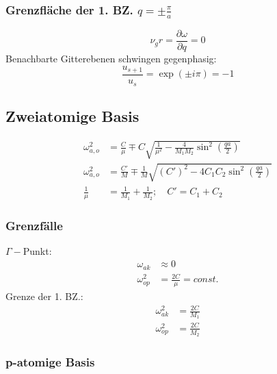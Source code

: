 \subsubsection*{Grenzfläche der 1. BZ. $q = \pm \frac{\pi}{a}$}
\begin{equation*}
    \nu_gr = \frac{\partial \omega}{\partial q} = 0
\end{equation*}
Benachbarte Gitterebenen schwingen gegenphasig:
\begin{equation*}
    \frac{u_{s+1}}{u_s} = \exp \left(\pm i \pi\right) = -1
\end{equation*}

\subsection*{Zweiatomige Basis}

\begin{equation*}
    \begin{aligned}
        \omega_{a,o}^2 &= \frac{C}{\mu} \mp C \sqrt{\frac{1}{\mu^2}- \frac{4}{M_1M_2} \sin^2\left(\frac{qa}{2}\right)} \\
        \omega_{a,o}^2 &= \frac{C'}{M} \mp \frac{1}{M} \sqrt{(C')^2- 4C_1 C_2 \sin^2\left(\frac{qa}{2}\right)} \\
        \frac{1}{\mu} &= \frac{1}{M_1} + \frac{1}{M_2}; \quad C' = C_1 + C_2
    \end{aligned}
\end{equation*}

\subsubsection*{Grenzfälle}
$\Gamma-$Punkt:
\begin{equation*}
    \begin{aligned}
        \omega_{ak} & \approx 0 \\
        \omega_{op}^2 &= \frac{2C}{\mu} = const.
    \end{aligned}
\end{equation*}
Grenze der 1. BZ.:
\begin{equation*}
    \begin{aligned}
        \omega_{ak}^2 &= \frac{2C}{M_1} \\
        \omega_{op}^2 &= \frac{2C}{M_2}
    \end{aligned}
\end{equation*}

\subsubsection*{p-atomige Basis}

